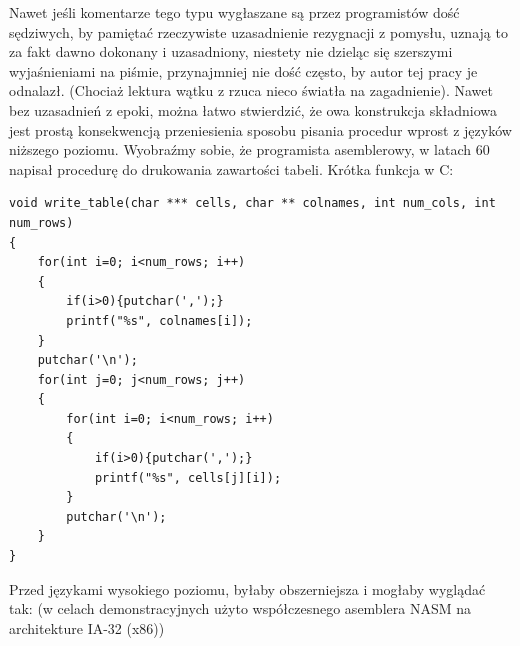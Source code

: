 Nawet jeśli komentarze tego typu wygłaszane są przez programistów dość sędziwych, by pamiętać rzeczywiste uzasadnienie rezygnacji z pomysłu, uznają to za fakt dawno dokonany i uzasadniony, niestety nie dzieląc się szerszymi wyjaśnieniami na piśmie, przynajmniej nie dość często, by autor tej pracy je odnalazł. (Chociaż lektura wątku z \cite{delreth_on_entry} rzuca nieco światła na zagadnienie).
Nawet bez uzasadnień z epoki, można łatwo stwierdzić, że owa konstrukcja składniowa jest prostą konsekwencją przeniesienia sposobu pisania procedur wprost z języków niższego poziomu. Wyobraźmy sobie, że programista asemblerowy, w latach 60 napisał procedurę do drukowania zawartości tabeli. Krótka funkcja w C:


\begin{lstlisting}
void write_table(char *** cells, char ** colnames, int num_cols, int num_rows)
{
    for(int i=0; i<num_rows; i++)
    {
        if(i>0){putchar(',');}
        printf("%s", colnames[i]);
    }
    putchar('\n');
    for(int j=0; j<num_rows; j++)
    {
        for(int i=0; i<num_rows; i++)
        {
            if(i>0){putchar(',');}
            printf("%s", cells[j][i]);
        }
        putchar('\n');
    }
}
\end{lstlisting}

Przed językami wysokiego poziomu, byłaby obszerniejsza i mogłaby wyglądać tak:
(w celach demonstracyjnych użyto współczesnego asemblera NASM na architekture IA-32 (x86))

